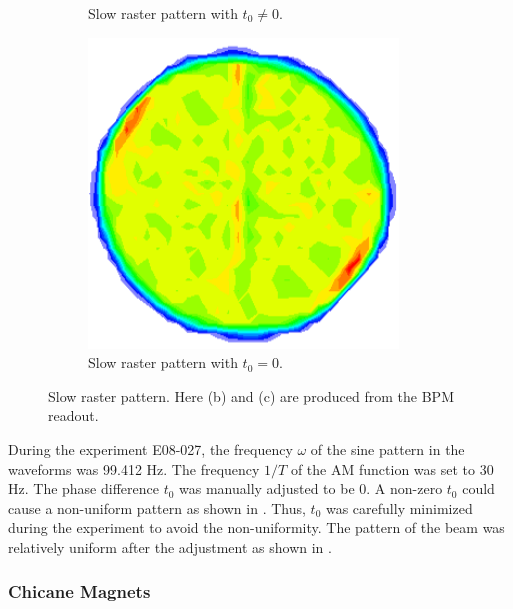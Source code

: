 \begin{figure}[tb!]
\begin{subfigure}[t]{0.2\textwidth}
    \caption{Slow raster pattern with $t_0\neq0$. \label{C5S2SS5F2b}}
  \end{subfigure}
  \qquad
  \begin{subfigure}[t]{0.2\textwidth}
    \includegraphics[width=\textwidth]{figs/slow-raster-pattern-data-good.png}
    \caption{Slow raster pattern with $t_0=0$. \label{C5S2SS5F2c}}
  \end{subfigure}
  \caption[Slow raster pattern.]{Slow raster pattern. Here (b) and (c) are produced from the BPM readout.  \label{C5S2SS5F2}}
\end{figure}

During the experiment E08-027, the frequency $\omega$ of the sine pattern in the waveforms was 99.412 Hz. The frequency $1/T$ of the AM function was set to 30 Hz. The phase difference $t_0$ was manually adjusted to be 0. A non-zero $t_0$ could cause a non-uniform pattern as shown in . Thus, $t_0$ was carefully minimized during the experiment to avoid the non-uniformity. The pattern of the beam was relatively uniform after the adjustment as shown in .

\subsubsection{Chicane Magnets}

